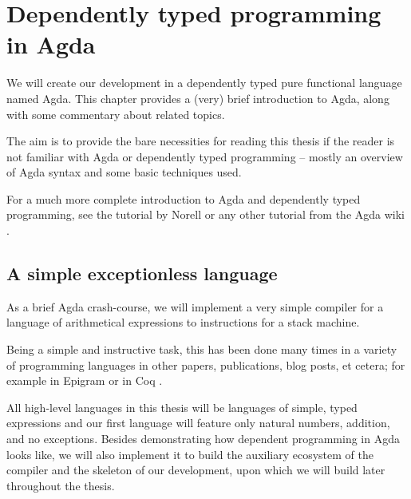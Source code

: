\chapter{Dependently typed programming in Agda}
\label{chap:dependent-types}

We will create our development in a dependently typed pure functional language named Agda.
This chapter provides a (very) brief introduction to Agda, along with some commentary about
related topics.


The aim is to provide the bare necessities for reading this thesis if the reader is not
familiar with Agda or dependently typed programming -- mostly an overview of Agda syntax and some
basic techniques used.


For a much more complete introduction to Agda and dependently typed programming, see the
tutorial by Norell \cite{norell08} or any other tutorial from the Agda wiki \cite{agda-wiki}.

\section{A simple exceptionless language}
\label{sec:simple-language}

As a brief Agda crash-course, we will implement a very simple compiler for a
language of arithmetical expressions to instructions for a stack machine.

Being a simple and instructive task, this has been done many times in a variety
of programming languages in other papers, publications, blog posts, et cetera;
for example in Epigram \cite{epigram-compiler} or in Coq \cite{chlipala:compiler}.

All high-level languages in this thesis will be languages of simple, typed
expressions and our first language will feature only natural numbers, addition,
and no exceptions. Besides demonstrating how dependent programming in Agda
looks like, we will also implement it to build the auxiliary ecosystem of the
compiler and the skeleton of our development, upon which we will build later
throughout the thesis.

